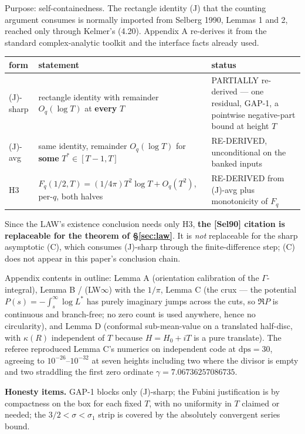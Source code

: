 \documentclass[11pt]{amsart}
\theoremstyle{remark}
\begin{document}
Purpose: self-containedness. The rectangle identity (J) that the
counting argument consumes is normally imported from Selberg 1990,
Lemmas 1 and 2, reached only through Kelmer's (4.20). Appendix A
re-derives it from the standard complex-analytic toolkit and the
interface facts already used.

\begin{center}
\begin{tabular}{p{2.2cm}p{7.3cm}p{3.5cm}}
\hline
form & statement & status \\
\hline
(J)-sharp & rectangle identity with remainder $O_q(\log T)$ at
\textbf{every} $T$ & PARTIALLY re-derived --- one residual, GAP-1, a
pointwise negative-part bound at height $T$ \\
(J)-avg & same identity, remainder $O_q(\log T)$ for \textbf{some}
$T^*\in[T-1,T]$ & RE-DERIVED, unconditional on the banked inputs \\
H3 & $F_q(1/2,T)=(1/4\pi)T^2\log T+O_q(T^2)$, per-$q$, both halves &
RE-DERIVED from (J)-avg plus monotonicity of $F_q$ \\
\hline
\end{tabular}
\end{center}

Since the LAW's existence conclusion needs only H3, \textbf{the [Sel90]
citation is replaceable for the theorem of \S\ref{sec:law}}. It is
\emph{not} replaceable for the sharp asymptotic (C), which consumes
(J)-sharp through the finite-difference step; (C) does not appear in
this paper's conclusion chain.

Appendix contents in outline: Lemma A (orientation calibration of the
$\Gamma$-integral), Lemma B / (LW$\infty$) with the $1/\pi$, Lemma C (the
crux --- the potential $P(s)=-\int_s^\infty\log L^*$ has purely
imaginary jumps across the cuts, so $\Re P$ is continuous and
branch-free; no zero count is used anywhere, hence no circularity), and
Lemma D (conformal sub-mean-value on a translated half-disc, with
$\kappa(R)$ independent of $T$ because $H=H_0+iT$ is a pure translate).
The referee reproduced Lemma C's numerics on independent code at
$\mathrm{dps}=30$, agreeing to $10^{-26}$--$10^{-32}$ at seven heights
including two where the divisor is empty and two straddling the first
zero ordinate $\gamma=7.06736257086735$.

\textbf{Honesty items.} GAP-1 blocks only (J)-sharp; the Fubini
justification is by compactness on the box for each fixed $T$, with no
uniformity in $T$ claimed or needed; the $3/2<\sigma<\sigma_1$ strip is
covered by the absolutely convergent series bound.
\end{document}
